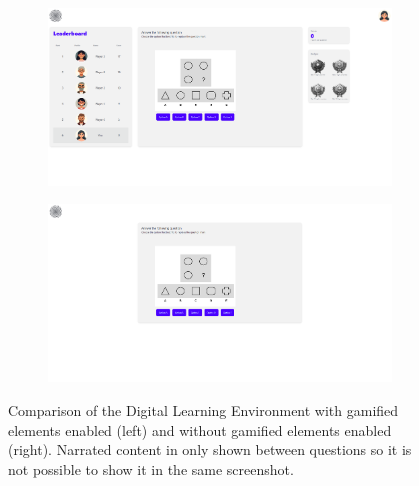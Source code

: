 \begin{figure}[H]
  \centering
  \begin{subfigure}[t]{0.4\textwidth}
    \includegraphics[width=\textwidth]{img/question_screen.png}
    \label{fig:figureScreenEnabled}
  \end{subfigure}
  \hspace{5mm}
  \begin{subfigure}[t]{0.4\textwidth}
    \includegraphics[width=\textwidth]{img/question_screen_no_elements.png}
    \label{fig:figureScreenDisabled}
  \end{subfigure}
  \caption{Comparison of the Digital Learning Environment with gamified elements enabled (left) and without gamified elements enabled (right). Narrated content in only shown between questions so it is not possible to show it in the same screenshot.}
  \label{fig:figureScreen}
\end{figure}

